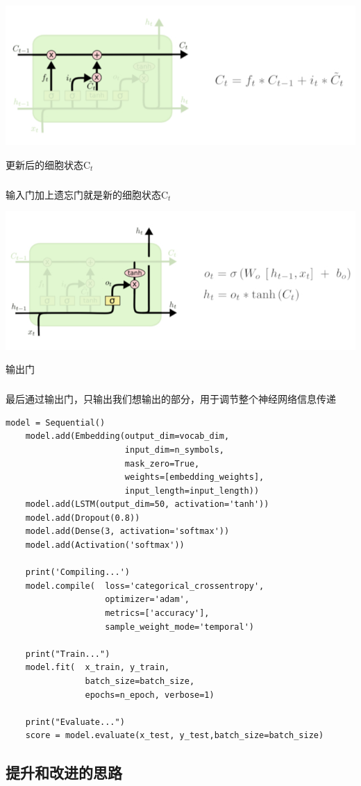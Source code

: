 \documentclass[a4paper]{article}
\begin{document}
\begin{center}
\includegraphics[width=0.8\linewidth]{3.PNG}
\end{center}
\centerline{更新后的细胞状态C$_t$}
\subparagraph{}输入门加上遗忘门就是新的细胞状态C$_t$

\begin{center}
\includegraphics[width=0.8\linewidth]{4.PNG}
\end{center}
\centerline{输出门}
\subparagraph{}最后通过输出门，只输出我们想输出的部分，用于调节整个神经网络信息传递
\newpage
\lstset{language=python}
\begin{lstlisting}[frame=shadowbox]
	model = Sequential()
    model.add(Embedding(output_dim=vocab_dim,
                        input_dim=n_symbols,
                        mask_zero=True,
                        weights=[embedding_weights],
                        input_length=input_length))
    model.add(LSTM(output_dim=50, activation='tanh'))
    model.add(Dropout(0.8))
    model.add(Dense(3, activation='softmax'))
    model.add(Activation('softmax'))

    print('Compiling...')
    model.compile(	loss='categorical_crossentropy',
    				optimizer='adam',
    				metrics=['accuracy'],
    				sample_weight_mode='temporal')

    print("Train...")
    model.fit(	x_train, y_train, 
    			batch_size=batch_size,
                epochs=n_epoch, verbose=1)

    print("Evaluate...")
    score = model.evaluate(x_test, y_test,batch_size=batch_size)
\end{lstlisting}
    \subsection{提升和改进的思路}
\end{document}
